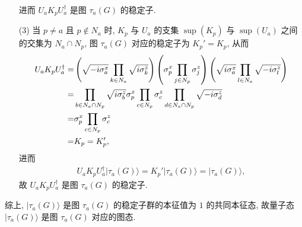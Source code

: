 \documentclass{assignment}
\begin{document}
\begin{pf}
\begin{itemize}
        进而 $U_aK_pU_a^{\dagger}$ 是图 $\tau_a(G)$ 的稳定子.
        \item[(3)] 当 $p\neq a$ 且 $p\notin N_a$ 时, $K_p$ 与 $U_a$ 的支集 $\sup(K_p)$ 与 $\sup(U_a)$ 之间的交集为 $N_a\cap N_p$, 图 $\tau_a(G)$ 对应的稳定子为 $K_p'=K_p$, 从而
        \begin{align}
            \notag U_aK_pU_a^{\dagger}=&\left(\sqrt{-i\sigma_a^x}\prod_{k\in N_a}\sqrt{i\sigma_k^z}\right)\left(\sigma_p^x\prod_{j\in N_p}\sigma_j^z\right)\left(\sqrt{i\sigma_a^x}\prod_{l\in N_a}\sqrt{-i\sigma_l^z}\right)\\
            \notag=&\prod_{b\in N_a\cap N_p}\sqrt{i\sigma_b^z}\sigma_p^x\prod_{c\in N_p}\sigma_c^z\prod_{d\in N_a\cap N_p}\sqrt{-i\sigma_d^z}\\
            \notag=&\sigma_p^x\prod_{c\in N_p}\sigma_c^z\\
            =&K_p=K_p',
        \end{align}
        进而
        \begin{align}
            U_aK_pU_a^{\dagger}\lvert\tau_a(G)\rangle=K_p'\lvert\tau_a(G)\rangle=\lvert\tau_a(G)\rangle,
        \end{align}
        故 $U_aK_pU_a^{\dagger}$ 是图 $\tau_a(G)$ 的稳定子.
    \end{itemize}

    综上, $\lvert\tau_a(G)\rangle$ 是图 $\tau_a(G)$ 的稳定子群的本征值为 $1$ 的共同本征态, 故量子态 $\lvert\tau_a(G)\rangle$ 是图 $\tau_a(G)$ 对应的图态.
\end{pf}
\end{document}
